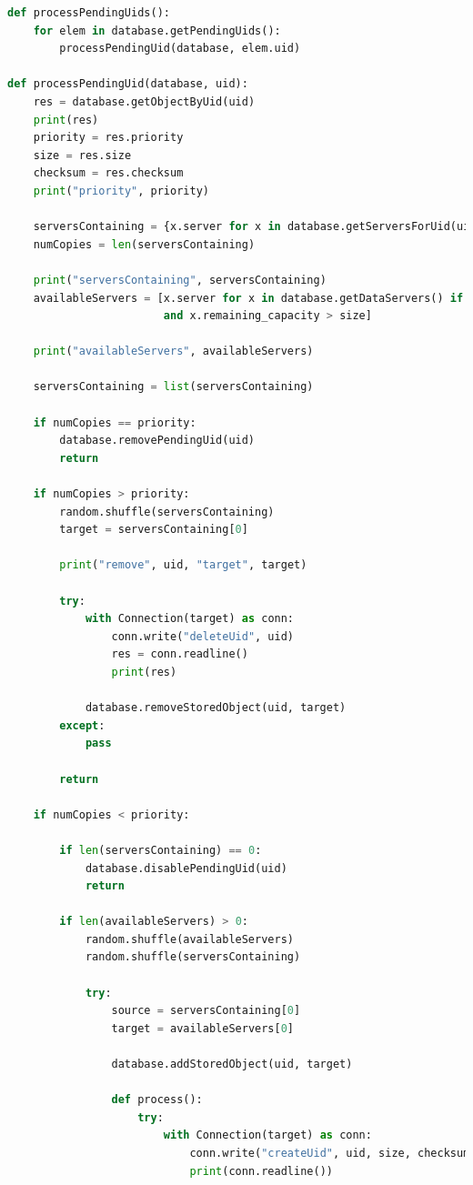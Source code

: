 \documentclass[11pt,a4paper,english]{article}
\begin{document}
\begin{lstlisting}[language=Python, title=Mantenimento del grado di replicazione dei documenti]
def processPendingUids():
    for elem in database.getPendingUids():
        processPendingUid(database, elem.uid)

def processPendingUid(database, uid):
    res = database.getObjectByUid(uid)
    print(res)
    priority = res.priority
    size = res.size
    checksum = res.checksum
    print("priority", priority)

    serversContaining = {x.server for x in database.getServersForUid(uid)}
    numCopies = len(serversContaining)

    print("serversContaining", serversContaining)
    availableServers = [x.server for x in database.getDataServers() if x.server not in serversContaining
                        and x.remaining_capacity > size]

    print("availableServers", availableServers)

    serversContaining = list(serversContaining)

    if numCopies == priority:
        database.removePendingUid(uid)
        return

    if numCopies > priority:
        random.shuffle(serversContaining)
        target = serversContaining[0]

        print("remove", uid, "target", target)

        try:
            with Connection(target) as conn:
                conn.write("deleteUid", uid)
                res = conn.readline()
                print(res)

            database.removeStoredObject(uid, target)
        except:
            pass

        return

    if numCopies < priority:

        if len(serversContaining) == 0:
            database.disablePendingUid(uid)
            return

        if len(availableServers) > 0:
            random.shuffle(availableServers)
            random.shuffle(serversContaining)

            try:
                source = serversContaining[0]
                target = availableServers[0]

                database.addStoredObject(uid, target)

                def process():
                    try:
                        with Connection(target) as conn:
                            conn.write("createUid", uid, size, checksum)
                            print(conn.readline())


\end{lstlisting}
\end{document}
